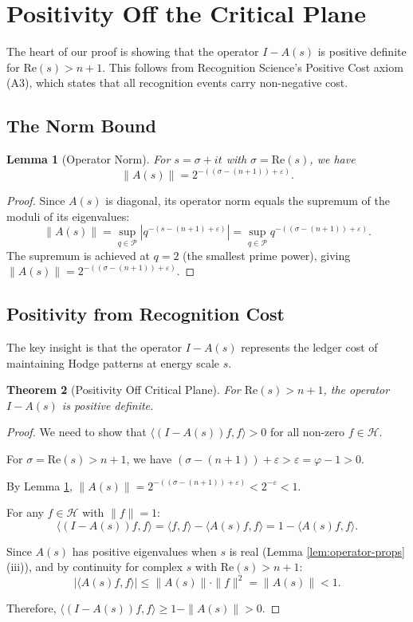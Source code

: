 \documentclass[12pt]{article}
\newtheorem{theorem}{Theorem}[section]
\newtheorem{lemma}[theorem]{Lemma}
\theoremstyle{definition}
\theoremstyle{remark}
\begin{document}
\section{Positivity Off the Critical Plane}
\label{sec:positivity}

The heart of our proof is showing that the operator $I - A(s)$ is positive definite for $\text{Re}(s) > n+1$. This follows from Recognition Science's Positive Cost axiom (A3), which states that all recognition events carry non-negative cost.

\subsection{The Norm Bound}

\begin{lemma}[Operator Norm]
\label{lem:norm-bound}
For $s = \sigma + it$ with $\sigma = \text{Re}(s)$, we have
\[
\|A(s)\| = 2^{-((\sigma-(n+1))+\varepsilon)}.
\]
\end{lemma}

\begin{proof}
Since $A(s)$ is diagonal, its operator norm equals the supremum of the moduli of its eigenvalues:
\[
\|A(s)\| = \sup_{q \in \mathcal{P}} |q^{-(s-(n+1)+\varepsilon)}| = \sup_{q \in \mathcal{P}} q^{-((\sigma-(n+1))+\varepsilon)}.
\]
The supremum is achieved at $q = 2$ (the smallest prime power), giving $\|A(s)\| = 2^{-((\sigma-(n+1))+\varepsilon)}$.
\end{proof}

\subsection{Positivity from Recognition Cost}

The key insight is that the operator $I - A(s)$ represents the ledger cost of maintaining Hodge patterns at energy scale $s$.

\begin{theorem}[Positivity Off Critical Plane]
\label{thm:positivity}
For $\text{Re}(s) > n+1$, the operator $I - A(s)$ is positive definite.
\end{theorem}

\begin{proof}
We need to show that $\langle (I - A(s))f, f \rangle > 0$ for all non-zero $f \in \mathcal{H}$.

For $\sigma = \text{Re}(s) > n+1$, we have $(\sigma-(n+1))+\varepsilon > \varepsilon = \varphi - 1 > 0$.

By Lemma \ref{lem:norm-bound}, $\|A(s)\| = 2^{-((\sigma-(n+1))+\varepsilon)} < 2^{-\varepsilon} < 1$.

For any $f \in \mathcal{H}$ with $\|f\| = 1$:
\[
\langle (I - A(s))f, f \rangle = \langle f, f \rangle - \langle A(s)f, f \rangle = 1 - \langle A(s)f, f \rangle.
\]

Since $A(s)$ has positive eigenvalues when $s$ is real (Lemma \ref{lem:operator-props}(iii)), and by continuity for complex $s$ with $\text{Re}(s) > n+1$:
\[
|\langle A(s)f, f \rangle| \leq \|A(s)\| \cdot \|f\|^2 = \|A(s)\| < 1.
\]

Therefore, $\langle (I - A(s))f, f \rangle \geq 1 - \|A(s)\| > 0$.
\end{proof}
\end{document}
